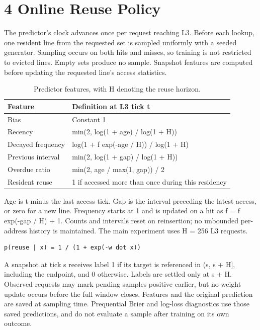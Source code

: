 \documentclass[10pt,a4paper]{article}
\begin{document}
\section*{4 Online Reuse Policy}
The predictor's clock advances once per request reaching L3. Before each lookup, one resident line from the requested set is sampled uniformly with a seeded generator. Sampling occurs on both hits and misses, so training is not restricted to evicted lines. Empty sets produce no sample. Snapshot features are computed before updating the requested line's access statistics.

\begin{table}[htbp]\centering\small
\caption{Predictor features, with H denoting the reuse horizon.}
\begin{tabularx}{\linewidth}{XX}
\toprule
Feature & Definition at L3 tick t \\
\midrule
Bias & Constant 1 \\
Recency & min(2, log(1 + age) / log(1 + H)) \\
Decayed frequency & log(1 + f exp(-age / H)) / log(1 + H) \\
Previous interval & min(2, log(1 + gap) / log(1 + H)) \\
Overdue ratio & min(2, age / max(1, gap)) / 2 \\
Resident reuse & 1 if accessed more than once during this residency \\
\bottomrule
\end{tabularx}\end{table}
Age is t minus the last access tick. Gap is the interval preceding the latest access, or zero for a new line. Frequency starts at 1 and is updated on a hit as f = f exp(-gap / H) + 1. Counts and intervals reset on reinsertion; no unbounded per-address history is maintained. The main experiment uses H = 256 L3 requests.

\begin{verbatim}
p(reuse | x) = 1 / (1 + exp(-w dot x))
\end{verbatim}
A snapshot at tick s receives label 1 if its target is referenced in (s, s + H], including the endpoint, and 0 otherwise. Labels are settled only at s + H. Observed requests may mark pending samples positive earlier, but no weight update occurs before the full window closes. Features and the original prediction are saved at sampling time. Prequential Brier and log-loss diagnostics use those saved predictions, and do not evaluate a sample after training on its own outcome.
\end{document}
